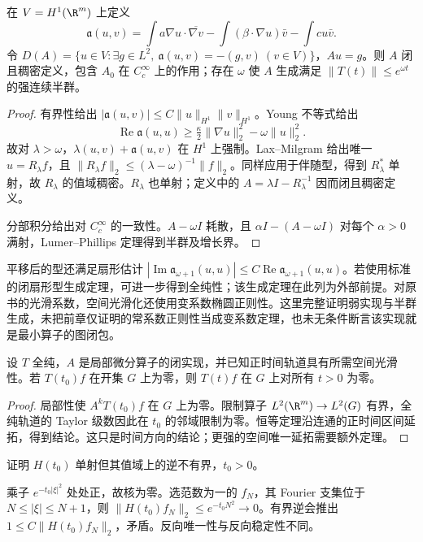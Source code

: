 \begin{theorem}[变系数扩散的弱实现]\label{thm:y14-elliptic-form}
在 $V=H^1(\R^m)$ 上定义
\[
 \mathfrak a(u,v)=\int a\nabla u\cdot\overline{\nabla v}
 -\int(\beta\cdot\nabla u)\bar v-\int cu\bar v.
\]
令 $D(A)=\{u\in V:\exists g\in L^2,\ \mathfrak a(u,v)=-(g,v)\ (v\in V)\}$，$Au=g$。则 $A$ 闭且稠密定义，包含 $A_0$ 在 $C_c^\infty$ 上的作用；存在 $\omega$ 使 $A$ 生成满足 $\|T(t)\|\le e^{\omega t}$ 的强连续半群。
\end{theorem}
\begin{proof}
有界性给出 $|\mathfrak a(u,v)|\le C\|u\|_{H^1}\|v\|_{H^1}$。Young 不等式给出
\[
 \operatorname{Re}\mathfrak a(u,u)\ge\tfrac\kappa2\|\nabla u\|_2^2-\omega\|u\|_2^2.
\]
故对 $\lambda>\omega$，$\lambda(u,v)+\mathfrak a(u,v)$ 在 $H^1$ 上强制。Lax--Milgram 给出唯一 $u=R_\lambda f$，且 $\|R_\lambda f\|_2\le(\lambda-\omega)^{-1}\|f\|_2$。同样应用于伴随型，得到 $R_\lambda^*$ 单射，故 $R_\lambda$ 的值域稠密。$R_\lambda$ 也单射；定义中的 $A=\lambda I-R_\lambda^{-1}$ 因而闭且稠密定义。

分部积分给出对 $C_c^\infty$ 的一致性。$A-\omega I$ 耗散，且 $\alpha I-(A-\omega I)$ 对每个 $\alpha>0$ 满射，Lumer--Phillips 定理得到半群及增长界。
\end{proof}

平移后的型还满足扇形估计 $|\operatorname{Im}\mathfrak a_{\omega+1}(u,u)|\le C\operatorname{Re}\mathfrak a_{\omega+1}(u,u)$。若使用标准的闭扇形型生成定理，可进一步得到全纯性；该生成定理在此列为外部前提。对原书的光滑系数，空间光滑化还使用变系数椭圆正则性。这里完整证明弱实现与半群生成，未把前章仅证明的常系数正则性当成变系数定理，也未无条件断言该实现就是最小算子的图闭包。

\begin{proposition}[局部零值的时间延拓]\label{prop:y14-time-uniqueness}
设 $T$ 全纯，$A$ 是局部微分算子的闭实现，并已知正时间轨道具有所需空间光滑性。若 $T(t_0)f$ 在开集 $G$ 上为零，则 $T(t)f$ 在 $G$ 上对所有 $t>0$ 为零。
\end{proposition}
\begin{proof}
局部性使 $A^kT(t_0)f$ 在 $G$ 上为零。限制算子 $L^2(\R^m)\to L^2(G)$ 有界，全纯轨道的 Taylor 级数因此在 $t_0$ 的邻域限制为零。恒等定理沿连通的正时间区间延拓，得到结论。这只是时间方向的结论；更强的空间唯一延拓需要额外定理。
\end{proof}

\begin{exercise}[反向热流不稳定]\label{ex:y14-backward-heat}
证明 $H(t_0)$ 单射但其值域上的逆不有界，$t_0>0$。
\end{exercise}
\begin{solution}
乘子 $e^{-t_0|\xi|^2}$ 处处正，故核为零。选范数为一的 $f_N$，其 Fourier 支集位于 $N\le|\xi|\le N+1$，则 $\|H(t_0)f_N\|_2\le e^{-t_0N^2}\to0$。有界逆会推出 $1\le C\|H(t_0)f_N\|_2$，矛盾。反向唯一性与反向稳定性不同。
\end{solution}

